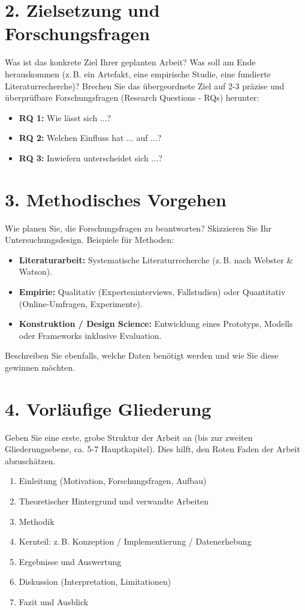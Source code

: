\section*{2. Zielsetzung und Forschungsfragen}
Was ist das konkrete Ziel Ihrer geplanten Arbeit? Was soll am Ende herauskommen (z.\,B. ein Artefakt, eine empirische Studie, eine fundierte Literaturrecherche)?
Brechen Sie das übergeordnete Ziel auf 2-3 präzise und überprüfbare Forschungsfragen (Research Questions - RQs) herunter:
\begin{itemize}
    \item \textbf{RQ 1:} Wie lässt sich ...?
    \item \textbf{RQ 2:} Welchen Einfluss hat ... auf ...?
    \item \textbf{RQ 3:} Inwiefern unterscheidet sich ...?
\end{itemize}

\section*{3. Methodisches Vorgehen}
Wie planen Sie, die Forschungsfragen zu beantworten? Skizzieren Sie Ihr Untersuchungsdesign.
Beispiele für Methoden:
\begin{itemize}
    \item \textbf{Literaturarbeit:} Systematische Literaturrecherche (z.\,B. nach Webster \& Watson).
    \item \textbf{Empirie:} Qualitativ (Experteninterviews, Fallstudien) oder Quantitativ (Online-Umfragen, Experimente).
    \item \textbf{Konstruktion / Design Science:} Entwicklung eines Prototyps, Modells oder Frameworks inklusive Evaluation.
\end{itemize}
Beschreiben Sie ebenfalls, welche Daten benötigt werden und wie Sie diese gewinnen möchten.

\section*{4. Vorläufige Gliederung}
Geben Sie eine erste, grobe Struktur der Arbeit an (bis zur zweiten Gliederungsebene, ca. 5-7 Hauptkapitel). Dies hilft, den Roten Faden der Arbeit abzuschätzen.
\begin{enumerate}
    \item Einleitung (Motivation, Forschungsfragen, Aufbau)
    \item Theoretischer Hintergrund und verwandte Arbeiten
    \item Methodik
    \item Kernteil: z.\,B. Konzeption / Implementierung / Datenerhebung
    \item Ergebnisse und Auswertung
    \item Diskussion (Interpretation, Limitationen)
    \item Fazit und Ausblick
\end{enumerate}

